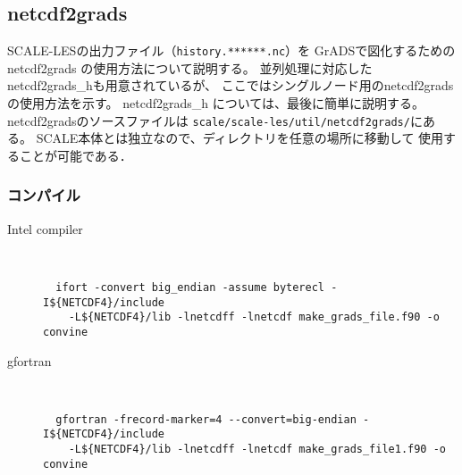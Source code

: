\subsection{netcdf2grads}

SCALE-LESの出力ファイル（\verb|history.******.nc|）を
GrADSで図化するためのnetcdf2grads の使用方法について説明する。
並列処理に対応したnetcdf2grads\_hも用意されているが、
ここではシングルノード用のnetcdf2gradsの使用方法を示す。
netcdf2grads\_h については、最後に簡単に説明する。
netcdf2gradsのソースファイルは \verb|scale/scale-les/util/netcdf2grads/|にある。
SCALE本体とは独立なので、ディレクトリを任意の場所に移動して
使用することが可能である．

\subsubsection{コンパイル}
\begin{description}
\item[Intel compiler]\mbox{}\\
 \begin{verbatim}
  ifort -convert big_endian -assume byterecl -I${NETCDF4}/include 
    -L${NETCDF4}/lib -lnetcdff -lnetcdf make_grads_file.f90 -o convine
  \end{verbatim}
\item[gfortran]\mbox{}\\
\begin{verbatim}
  gfortran -frecord-marker=4 --convert=big-endian -I${NETCDF4}/include
    -L${NETCDF4}/lib -lnetcdff -lnetcdf make_grads_file1.f90 -o convine
\end{verbatim}
\end{description}



